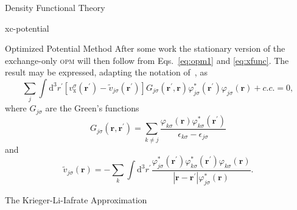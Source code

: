 \documentclass[letterpaper, 11 pt]{report}
\begin{document}
\begin{chapter}{Density Functional Theory \label{chap:dft}}
\begin{section}{xc-potential \label{sec:xcpot}}
\begin{subsection}{Optimized Potential Method \label{sec:opm}}
         After some work the stationary version of the exchange-only \textsc{opm} will then follow from
         Eqs.~\eqref{eq:opm1} and \eqref{eq:xfunc}. The result may be expressed, adapting the notation
         of~\cite{klieq}, as
         \begin{equation} \label{eq:opmEq}
            \sum\limits_j \int \mathrm{d}^3 r^\prime
            \left[ v^\sigma_\mathrm{x}(\mathbf{r}^\prime)
                 - \tilde{v}_{j \sigma} (\mathbf{r}^\prime) \right]
                 G_{j \sigma}(\mathbf{r}^\prime, \mathbf{r}) \varphi^*_{j \sigma} (\mathbf{r}^\prime)
                 \varphi_{j \sigma} (\mathbf{r}) + c.c. = 0,
         \end{equation}
         where $G_{j \sigma}$ are the Green's functions
         \begin{equation}
            G_{j \sigma}(\mathbf{r}, \mathbf{r}^\prime) = \sum\limits_{k \neq j}
            \frac{\varphi_{k \sigma} (\mathbf{r}) \varphi^*_{k \sigma} (\mathbf{r}^\prime)}
            {\epsilon_{k \sigma} - \epsilon_{j \sigma}}
         \end{equation}
         and
         \begin{equation} \label{eq:tildev}
            \tilde{v}_{j \sigma} (\mathbf{r}) =  - \sum\limits_k \int \mathrm{d}^3 r^\prime
               \frac{ \varphi^*_{j \sigma} (\mathbf{r}^\prime) \varphi^*_{k \sigma} (\mathbf{r}^\prime)
                      \varphi_{k \sigma} (\mathbf{r}) }
                      {\left| \mathbf{r} - \mathbf{r}^\prime \right| \varphi^*_{j \sigma} (\mathbf{r})}.
         \end{equation}

      \end{subsection}

      \begin{subsection}{The Krieger-Li-Iafrate Approximation \label{sec:kli}}


\end{subsection}
\end{section}
\end{chapter}
\end{document}
